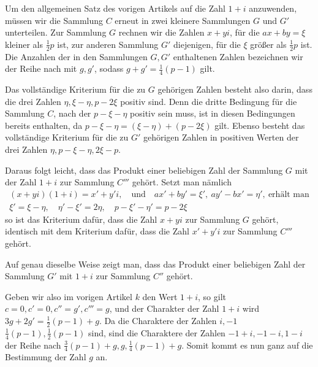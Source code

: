 %
Um den allgemeinen Satz des vorigen Artikels auf die Zahl $1+i$ anzuwenden, müssen wir die Sammlung $C$ erneut in zwei kleinere Sammlungen $G$ und $G'$ unterteilen. Zur Sammlung $G$ rechnen wir die Zahlen $x+yi$, für die $ax+by=\xi$ kleiner als $\frac12p$ ist, zur anderen Sammlung $G'$ diejenigen, für die $\xi$ größer als $\frac12p$ ist. Die Anzahlen der in den Sammlungen $G,G'$ enthaltenen Zahlen bezeichnen wir der Reihe nach mit $g,g'$, sodass $g+g'=\frac14(p-1)$ gilt.

Das vollständige Kriterium für die zu $G$ gehörigen Zahlen besteht also darin, dass die drei Zahlen $\eta,\xi-\eta,p-2\xi$ positiv sind. Denn die dritte Bedingung für die Sammlung $C$, nach der $p-\xi-\eta$ positiv sein muss, ist in diesen Bedingungen bereits enthalten, da $p-\xi-\eta=(\xi-\eta)+(p-2\xi)$ gilt. Ebenso besteht das vollständige Kriterium für die zu $G'$ gehörigen Zahlen in positiven Werten der drei Zahlen $\eta,p-\xi-\eta,2\xi-p$.

Daraus folgt leicht, dass das Produkt einer beliebigen Zahl der Sammlung $G$ mit der Zahl $1+i$ zur Sammlung $C'''$ gehört. Setzt man nämlich
\[
\begin{gathered}
(x+yi)(1+i)=x'+y'i,\quad\text{und}\quad ax'+by'=\xi',\ ay'-bx'=\eta',\ \text{erhält man}\\
\xi'=\xi-\eta,\quad\eta'-\xi'=2\eta,\quad p-\xi'-\eta'=p-2\xi
\end{gathered}
\]
so ist das Kriterium dafür, dass die Zahl $x+yi$ zur Sammlung $G$ gehört, identisch mit dem Kriterium dafür, dass die Zahl $x'+y'i$ zur Sammlung $C'''$ gehört.

Auf genau dieselbe Weise zeigt man, dass das Produkt einer beliebigen Zahl der Sammlung $G'$ mit $1+i$ zur Sammlung $C''$ gehört.

Geben wir also im vorigen Artikel $k$ den Wert $1+i$, so gilt $c=0,c'=0,c''=g',c'''=g$, und der Charakter der Zahl $1+i$ wird $3g+2g'=\frac12(p-1)+g$. Da die Charaktere der Zahlen $i,-1$ $\frac14(p-1),\frac12(p-1)$ sind, sind die Charaktere der Zahlen $-1+i,-1-i,1-i$ der Reihe nach $\frac34(p-1)+g,g,\frac14(p-1)+g$. Somit kommt es nun ganz auf die Bestimmung der Zahl $g$ an.
